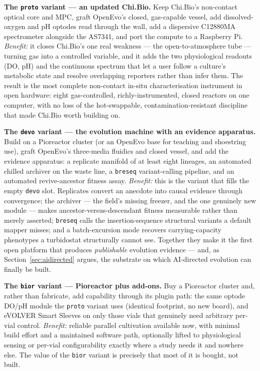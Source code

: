 \documentclass[11pt,a4paper]{article}
\newcommand{\code}[1]{\texttt{\small #1}}
\begin{document}
\textbf{The \texttt{proto} variant --- an updated Chi.Bio.} Keep Chi.Bio's non-contact optical core
and MPC, graft OpenEvo's closed, gas-capable vessel, add dissolved-oxygen and pH optodes read
through the wall, add a dispersive C12880MA spectrometer alongside the AS7341, and port the compute
to a Raspberry Pi. \emph{Benefit:} it closes Chi.Bio's one real weakness --- the open-to-atmosphere
tube --- turning gas into a controlled variable, and it adds the two physiological readouts (DO,
pH) and the continuous spectrum that let a user follow a culture's metabolic state and resolve
overlapping reporters rather than infer them. The result is the most complete non-contact in-situ
characterisation instrument in open hardware: eight gas-controlled, richly-instrumented, closed
reactors on one computer, with no loss of the hot-swappable, contamination-resistant discipline
that made Chi.Bio worth building on.

\textbf{The \texttt{devo} variant --- the evolution machine with an evidence apparatus.} Build on a
Pioreactor cluster (or an OpenEvo base for teaching and shoestring use), graft OpenEvo's three-media
fluidics and closed vessel, and add the evidence apparatus: a replicate manifold of at least eight
lineages, an automated chilled archiver on the waste line, a \code{breseq} variant-calling pipeline,
and an automated revive-ancestor fitness assay. \emph{Benefit:} this is the variant that fills the
empty \texttt{devo} slot. Replicates convert an anecdote into causal evidence through convergence;
the archiver --- the field's missing freezer, and the one genuinely new module --- makes
ancestor-versus-descendant fitness measurable rather than merely asserted; \code{breseq} calls the
insertion-sequence structural variants a default mapper misses; and a batch-excursion mode recovers
carrying-capacity phenotypes a turbidostat structurally cannot see. Together they make it the first
open platform that produces \emph{publishable} evolution evidence --- and, as
Section~\ref{sec:aidirected} argues, the substrate on which AI-directed evolution can finally be
built.

\textbf{The \texttt{bior} variant --- Pioreactor plus add-ons.} Buy a Pioreactor cluster and, rather
than fabricate, add capability through its plugin path: the same optode DO/pH module the
\texttt{proto} variant uses (identical footprint, no new board), and eVOLVER Smart Sleeves on only
those vials that genuinely need arbitrary per-vial control. \emph{Benefit:} reliable parallel
cultivation available now, with minimal build effort and a maintained software path, optionally
lifted to physiological sensing or per-vial configurability exactly where a study needs it and
nowhere else. The value of the \texttt{bior} variant is precisely that most of it is bought, not
built.
\end{document}
